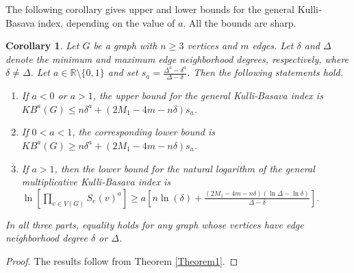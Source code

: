 \documentclass[10pt,a4paper]{amsart}
\newtheorem{cor}[theorem]{Corollary}
\numberwithin{equation}{section}
\begin{document}
The following corollary gives upper and lower bounds for the general Kulli-Basava index, depending on the value of $a$. All the bounds are sharp.

\begin{cor}\label{Cor1}
Let $G$ be a graph with $n\geq 3$ vertices and $m$ edges. Let $\delta$ and $\Delta$ denote the minimum and maximum edge neighborhood degrees, respectively, where $\delta\neq\Delta$. Let $a\in\mathbb{R}\setminus\{0,1\}$ and set $s_a=\frac{\Delta^a-\delta^a}{\Delta-\delta}$. Then the following statements hold.

\begin{enumerate}
        \item If $a < 0$ or $a > 1$, the upper bound for the general Kulli-Basava index is $ KB^a(G) \leq n\delta^a +  (2M_1 - 4m - n\delta)s_a$.

    
    \item If $0<a<1$, the corresponding lower bound is $KB^a(G)\geq n\delta^a+(2M_1-4m-n\delta)s_a$.

    \item If $a>1$, then the lower bound for the natural logarithm of the general multiplicative Kulli-Basava index is 
$\ln\left[\prod_{v\in V(G)}S_e(v)^a\right]\geq a\left[n\ln(\delta)+\frac{(2M_1-4m-n\delta)(\ln\Delta-\ln\delta)}{\Delta-\delta}\right]$.
    

\end{enumerate}
In all three parts, equality holds for any graph whose vertices have edge neighborhood degree $\delta$ or $\Delta$.
\end{cor}

\begin{proof}
The results follow from Theorem \ref{Theorem1}.
\end{proof}
\end{document}

